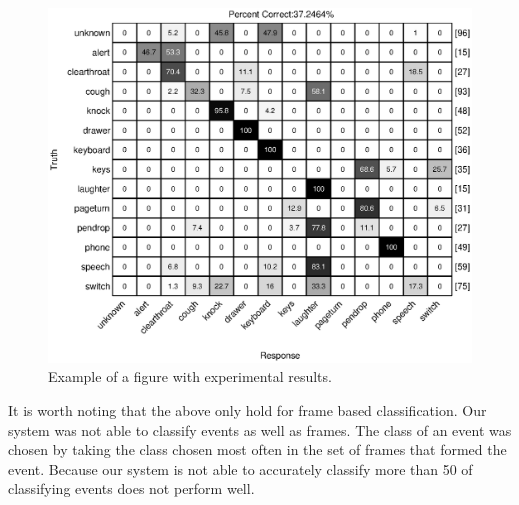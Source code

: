 \begin{figure}[h]
  \centering
  \centerline{\includegraphics[width=\columnwidth]{confmatrix2}}
  \caption{Example of a figure with experimental results.}
  \label{fig:confmat_seg}
\end{figure}

It is worth noting that the above only hold for frame based classification. Our system was
not able to classify events as well as frames. The class of an event was chosen by taking 
the class chosen most often in the set of frames that formed the event. Because our system
is not able to accurately classify more than 50%
of classifying events does not perform well.  